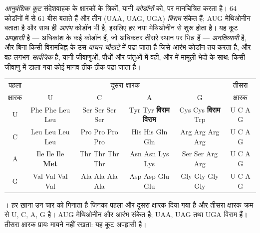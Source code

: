 \begin{definition}[आनुवंशिक कूट]\label{def:b1:gene-expression:code}
\emph{आनुवंशिक कूट} संदेशवाहक के क्षारकों के त्रिकों, यानी
\emph{कोडॉनों} को,  पर मानचित्रित करता है। 64 कोडॉनों में से
61 बीस  बताते हैं और तीन (UAA, UAG, UGA) \emph{विराम} संकेत
हैं; AUG मेथिओनीन बताता है और साथ ही \emph{आरंभ} कोडॉन भी है, इसलिए हर
नया  मेथिओनीन से शुरू होता है। यह कूट
\emph{अपह्रासी} है --- अधिकांश  के कई कोडॉन हैं, जो अधिकतर
तीसरे स्थान पर भिन्न हैं --- \emph{अनतिव्यापी} है, और बिना किसी
विरामचिह्न के उस \emph{वाचन-चौखटे} में पढ़ा जाता है जिसे आरंभ कोडॉन तय
करता है, और वह लगभग \emph{सार्वत्रिक} है, यानी जीवाणुओं, पौधों और जंतुओं
में वही, और  में मामूली भेदों के साथ: किसी जीवाणु में डाला
गया कोई मानव  ठीक-ठीक पढ़ा जाता है।
\end{definition}

\begin{omfigure}
\begin{center}
\footnotesize
\begin{tabular}{c|cccc|c}
\hline
पहला & \multicolumn{4}{c|}{दूसरा क्षारक} & तीसरा \\
क्षारक & U & C & A & G & क्षारक \\
\hline
U & Phe Phe Leu Leu & Ser Ser Ser Ser & Tyr Tyr \textbf{विराम} \textbf{विराम} & Cys Cys \textbf{विराम} Trp & U C A G \\
C & Leu Leu Leu Leu & Pro Pro Pro Pro & His His Gln Gln & Arg Arg Arg Arg & U C A G \\
A & Ile Ile Ile \textbf{Met} & Thr Thr Thr Thr & Asn Asn Lys Lys & Ser Ser Arg Arg & U C A G \\
G & Val Val Val Val & Ala Ala Ala Ala & Asp Asp Glu Glu & Gly Gly Gly Gly & U C A G \\
\hline
\end{tabular}
\end{center}

{\small {}। हर ख़ाना उन चार  को गिनाता है जिनका पहला और
दूसरा क्षारक दिया गया है और तीसरा क्षारक क्रम से U, C, A, G है। AUG
मेथिओनीन और आरंभ संकेत है; UAA, UAG तथा UGA विराम हैं। तीसरा
क्षारक प्रायः मायने नहीं रखता: यह कूट अपह्रासी है।}
\end{omfigure}

